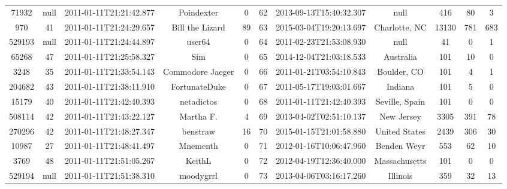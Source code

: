 \documentclass[12pt,a4paper,twoside,openright,titlepage,final]{article}
\begin{document}
\begin{landscape}
\begin{center}
\begin{longtable}{@{\extracolsep{\fill}}*{11}{c}}
			71932     & null & 2011-01-11T21:21:42.877 & Poindexter            & 0         & 62    & 2013-09-13T15:40:32.307 & null                             & 416        & 80      & 3     \\
			970       & 41   & 2011-01-11T21:24:29.657 & Bill the Lizard       & 89        & 63    & 2015-03-04T19:20:13.697 & Charlotte, NC                    & 13130      & 781     & 683   \\
			529193    & null & 2011-01-11T21:24:44.897 & user64                & 0         & 64    & 2011-02-23T21:53:08.930 & null                             & 41         & 0       & 1     \\
			65268     & 47   & 2011-01-11T21:25:58.327 & Sim                   & 0         & 65    & 2014-12-04T21:03:18.533 & Australia                        & 101        & 10      & 0     \\
			3248      & 35   & 2011-01-11T21:33:54.143 & Commodore Jaeger      & 0         & 66    & 2011-01-21T03:54:10.843 & Boulder, CO                      & 101        & 4       & 1     \\
			204682    & 43   & 2011-01-11T21:38:11.910 & FortunateDuke         & 0         & 67    & 2011-05-17T19:03:01.667 & Indiana                          & 101        & 5       & 0     \\
			15179     & 40   & 2011-01-11T21:42:40.393 & netadictos            & 0         & 68    & 2011-01-11T21:42:40.393 & Seville, Spain                   & 101        & 0       & 0     \\
			508114    & 42   & 2011-01-11T21:43:22.127 & Martha F.             & 4         & 69    & 2013-04-02T02:51:10.137 & New Jersey                       & 3305       & 391     & 78    \\
			270296    & 42   & 2011-01-11T21:48:27.347 & benstraw              & 16        & 70    & 2015-01-15T21:01:58.880 & United States                    & 2439       & 306     & 30    \\
			10987     & 27   & 2011-01-11T21:48:41.497 & Mnementh              & 0         & 71    & 2012-01-16T10:06:47.960 & Benden Weyr                      & 553        & 62      & 10    \\
			3769      & 48   & 2011-01-11T21:51:05.267 & KeithL                & 0         & 72    & 2012-04-19T12:36:40.000 & Massachusetts                    & 101        & 0       & 0     \\
			529194    & null & 2011-01-11T21:51:38.310 & moodygrrl             & 0         & 73    & 2013-04-06T03:16:17.260 & Illinois                         & 359        & 32      & 13    \\

\end{longtable}
\end{center}
\end{landscape}
\end{document}
